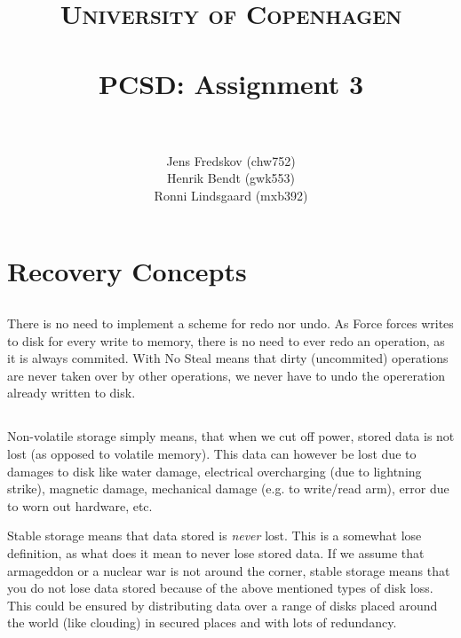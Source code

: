 \documentclass[a4paper, 11pt]{article}
\title{ 
\normalfont \normalsize 
\textsc{University of Copenhagen} \\ [25pt]
\horrule{0.5pt} \\[0.4cm]
\huge PCSD: Assignment 3 \\
\horrule{2pt} \\[0.5cm]
}
\author{Jens Fredskov (chw752)\\Henrik Bendt (gwk553)\\Ronni Lindsgaard (mxb392)} %
\begin{document}
\maketitle
\pagebreak

\section{Recovery Concepts} %
\label{sec:recovery_concepts}

\subsection{} %

There is no need to implement a scheme for redo nor undo. As Force forces writes to disk for every write to memory, there is no need to ever redo an operation, as it is always commited. With No Steal means that dirty (uncommited) operations are never taken over by other operations, we never have to undo the opereration already written to disk.


\subsection{} %

Non-volatile storage simply means, that when we cut off power, stored data is not lost (as opposed to volatile memory). This data can however be lost due to damages to disk like water damage, electrical overcharging (due to lightning strike), magnetic damage, mechanical damage (e.g. to write/read arm), error due to worn out hardware, etc.

Stable storage means that data stored is \textit{never} lost. This is a somewhat lose definition, as what does it mean to never lose stored data. If we assume that armageddon or a nuclear war is not around the corner, stable storage means that you do not lose data stored because of the above mentioned types of disk loss. This could be ensured by distributing data over a range of disks placed around the world (like clouding) in secured places and with lots of redundancy.


\subsection{} %
\end{document}
